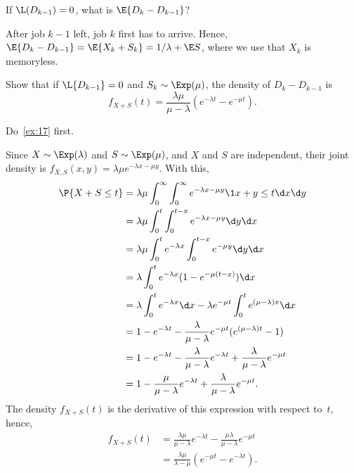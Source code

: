 \begin{exercise}\label{ex:17}
 If  $\L(D_{k-1}) = 0$, what is $\E{D_{k}-D_{k-1}}$?
\begin{solution}
  After job $k-1$ left, job $k$ first has to arrive.
  Hence, $\E{D_k - D_{k-1}} = \E{X_k + S_k} = 1/\lambda + \E S$, where we use that $X_k$ is memoryless.
\end{solution}
\end{exercise}

\begin{exercise}\label{ex:46}
Show that if $\L{D_{k-1}} = 0$ and $S_k \sim\Exp(\mu)$,  the density of $D_{k} - D_{k-1}$ is
 \begin{equation*}
 f_{X+S}(t) = \frac{\lambda \mu}{\mu-\lambda} (e^{-\lambda t} - e^{-\mu t}).
 \end{equation*}
\begin{hint}
  Do~\cref{ex:17} first.
\end{hint}
\begin{solution}
Since $X\sim \Exp(\lambda)$ and $S\sim\Exp(\mu)$, and $X$ and $S$ are independent, their joint density is $f_{X,S}(x,y) = \lambda \mu e^{-\lambda x - \mu y}$. With this,
 \begin{align*}
\P{X+S\leq t }
&= \lambda \mu \int_0^\infty \int_0^\infty e^{-\lambda x - \mu y} \1{x+y\leq t} \d x \d y \\
&= \lambda \mu \int_0^t \int_0^{t-x} e^{-\lambda x - \mu y} \d y \d x \\
&= \lambda \mu \int_0^t e^{-\lambda x} \int_0^{t-x} e^{- \mu y} \d y \d x \\
&= \lambda \int_0^t e^{-\lambda x} (1-e^{- \mu (t-x)} ) \d x \\
&= \lambda \int_0^t e^{-\lambda x} \d x - \lambda e^{-\mu t} \int_0^t e^{(\mu-\lambda) x} \d x \\
&= 1- e^{-\lambda t} - \frac{\lambda}{\mu-\lambda} e^{-\mu t} ( e^{(\mu-\lambda) t} -1) \\
&= 1- e^{-\lambda t} - \frac{\lambda}{\mu-\lambda} e^{-\lambda t} + \frac{\lambda}{\mu-\lambda} e^{-\mu t} \\
&= 1 - \frac{\mu}{\mu-\lambda} e^{-\lambda t} + \frac{\lambda}{\mu-\lambda} e^{-\mu t}. \\
 \end{align*}
The density $f_{X+S}(t)$ is the derivative of this expression with respect to~$t$, hence,
\begin{align*}
 f_{X+S}(t)
&= \frac{\lambda\mu}{\mu-\lambda} e^{-\lambda t} - \frac{\mu \lambda}{\mu-\lambda} e^{-\mu t} \\
&= \frac{\lambda\mu}{\lambda -\mu}(e^{-\mu t} - e^{-\lambda t}). \\
\end{align*}


\end{solution}
\end{exercise}

